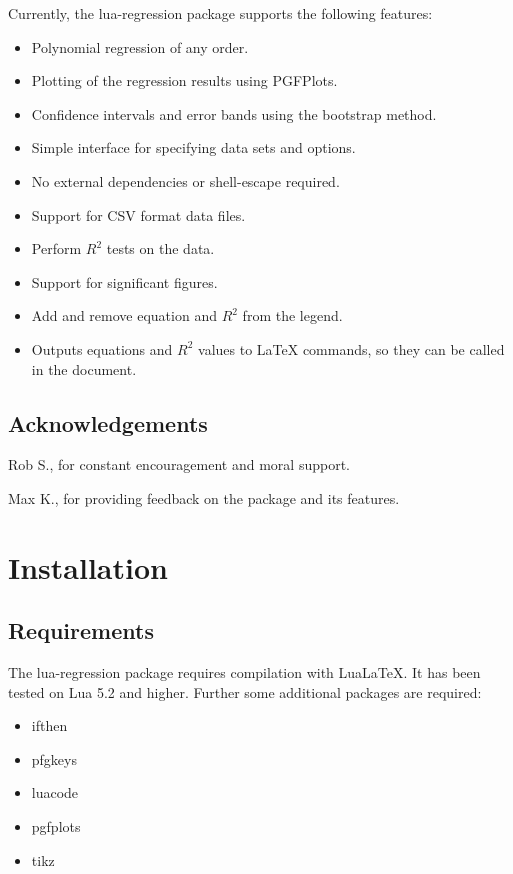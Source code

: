 \documentclass[11pt]{article}
\begin{document}
    Currently, the {\ttfamily lua-regression} package supports the following features:
    \begin{itemize}
        \item Polynomial regression of any order.
        \item Plotting of the regression results using PGFPlots.
        \item Confidence intervals and error bands using the bootstrap method.
        \item Simple interface for specifying data sets and options.
        \item No external dependencies or {\ttfamily shell-escape} required.
        \item Support for CSV format data files.
        \item Perform $R^2$ tests on the data.
        \item Support for significant figures.
        \item Add and remove equation and $R^2$ from the legend.
        \item Outputs equations and $R^2$ values to LaTeX commands, so they can be called in the document.
    \end{itemize}

    \subsection{Acknowledgements}

    Rob S., for constant encouragement and moral support.

    \noindent
    Max K., for providing feedback on the package and its features.

    \section{Installation}

    \subsection{Requirements}
    
    The {\ttfamily lua-regression} package requires compilation with Lua\LaTeX. It has been tested on Lua 5.2 and higher.
    Further some additional packages are required:

    \begin{multicols}{3}
        {\ttfamily
            \begin{itemize}
            	\item ifthen
                \item pfgkeys
                \item luacode
                \item pgfplots
                \item tikz
            \end{itemize}
        }
    \end{multicols}
\end{document}
